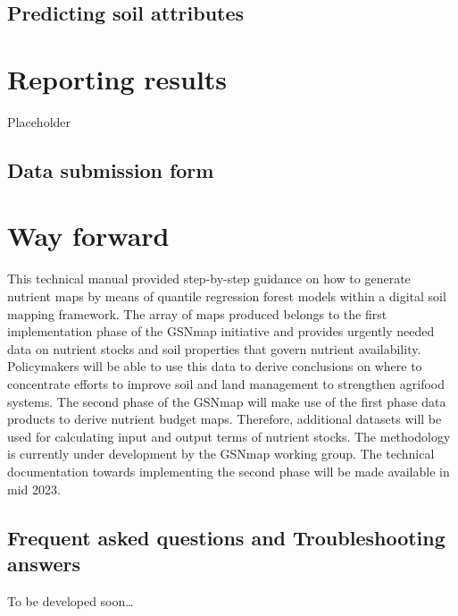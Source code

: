 \documentclass[
  10pt,
  b5paper,
  oneside]{book}
\begin{document}
\hypertarget{predicting-soil-attributes}{%
\section{Predicting soil attributes}\label{predicting-soil-attributes}}

\hypertarget{reporting-results}{%
\chapter{Reporting results}\label{reporting-results}}

Placeholder

\hypertarget{data-submission-form}{%
\section{Data submission form}\label{data-submission-form}}

\hypertarget{way-forward}{%
\chapter{Way forward}\label{way-forward}}

This technical manual provided step-by-step guidance on how to generate nutrient maps by means of quantile regression forest models within a digital soil mapping framework. The array of maps produced belongs to the first implementation phase of the GSNmap initiative and provides urgently needed data on nutrient stocks and soil properties that govern nutrient availability. Policymakers will be able to use this data to derive conclusions on where to concentrate efforts to improve soil and land management to strengthen agrifood systems.
The second phase of the GSNmap will make use of the first phase data products to derive nutrient budget maps. Therefore, additional datasets will be used for calculating input and output terms of nutrient stocks. The methodology is currently under development by the GSNmap working group. The technical documentation towards implementing the second phase will be made available in mid 2023.

\hypertarget{frequent-asked-questions-and-troubleshooting-answers}{%
\section{Frequent asked questions and Troubleshooting answers}\label{frequent-asked-questions-and-troubleshooting-answers}}

To be developed soon\ldots{}
\end{document}

